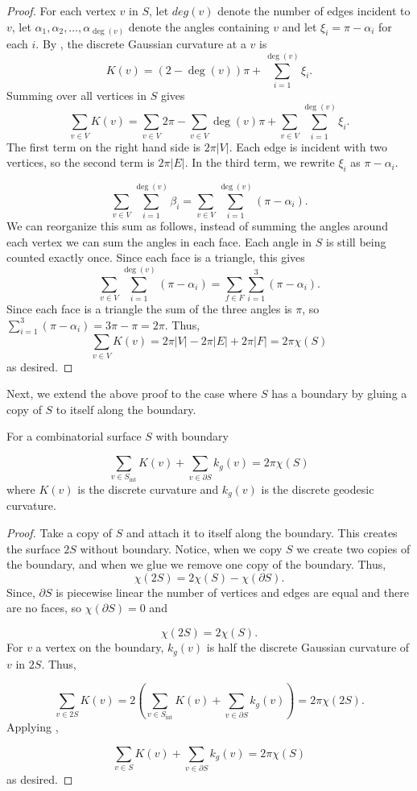 \begin{proof}

For each vertex $v$ in $S$,
let $deg(v)$ denote the number of edges incident to $v$, let $\alpha_1,\alpha_2,\ldots,\alpha_{\deg{(v)}}$ denote the angles
containing $v$ and let $\xi_i=\pi-\alpha_i$ for each $i$.
By , 
the discrete Gaussian curvature at a $v$ is
 $$K(v)=(2-\deg{(v)})\pi +\sum_{i=1}^{\deg{(v)}} \xi_i.$$
Summing over all vertices in $S$ gives
$$\sum_{v\in V} K(v)=\sum_{v\in V}2\pi - \sum_{v\in V}\deg{(v)}\pi+\sum_{v\in V}\sum_{i=1}^{\deg{(v)}} \xi_i.$$
The first term on the right hand side is $2\pi |V|$. Each edge is incident with two vertices, so the second term is $2\pi |E|$. 
In the third term, we rewrite $\xi_i$ as $\pi-\alpha_i$.

$$ \sum_{v\in V}\sum_{i=1}^{\deg{(v)}} \beta_i= \sum_{v\in V}\sum_{i=1}^{\deg{(v)}} (\pi-\alpha_i).$$
We can reorganize this sum as follows, instead of summing the angles around each vertex we can sum the angles in each face.
Each angle in $S$ is still being counted exactly once. 
Since each face is a triangle, this gives
$$\sum_{v\in V}\sum_{i=1}^{\deg{(v)}} (\pi-\alpha_i)=\sum_{f\in F}\sum_{i=1}^3(\pi-\alpha_i).$$
Since each face is a triangle the sum of the three angles is $\pi$,
so $\sum_{i=1}^3(\pi-\alpha_i)=3\pi-\pi=2\pi.$
Thus, $$\sum_{v\in V} K(v)=2\pi |V|-2\pi |E|+2\pi |F|=2\pi \chi(S)$$ as desired.
\end{proof}

Next, we extend the above proof to the case where $S$ has a boundary
by gluing a copy of $S$ to itself along the boundary.

\begin{theorem}\label{thm:g-b-discete}
For a combinatorial surface $S$ with boundary

$$\sum_{v\in S_{\text{int}}} K(v)+\sum_{v\in\partial S}k_g(v)=2\pi \chi(S)$$
where $K(v)$ is the discrete curvature and $k_g(v)$ is the discrete geodesic curvature.
\end{theorem}

\begin{proof}
Take a copy of $S$ and attach it to itself along the boundary.
This creates the surface $2S$ without boundary. Notice,
when we copy $S$ we create two copies of the boundary, and when
we glue we remove one copy of the boundary.
Thus, $$\chi(2S)=2\chi(S)-\chi(\partial S).$$
Since, $\partial S$ is piecewise linear the number of vertices and
edges are equal and there are no faces, so $\chi(\partial S)=0$
and 

\begin{equation} \label{eqn:glue}
\chi(2S)=2\chi(S).
\end{equation}
For $v$ a vertex on the boundary, $k_g(v)$ is half
the discrete Gaussian curvature of $v$ in $2S.$
Thus,

$$\sum_{v\in 2S}K(v)=2\left(\sum_{v\in S_{\text{int}}}K(v)+\sum_{v\in \partial S} k_g(v)\right) =2\pi  \chi(2S).$$
Applying ,

$$\sum_{v\in S}K(v)+\sum_{v\in \partial S} k_g(v)=2\pi  \chi(S)$$
as desired.

\end{proof}


